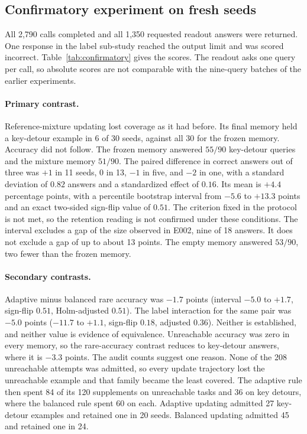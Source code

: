 \documentclass[11pt]{article}
\begin{document}
\subsection{Confirmatory experiment on fresh seeds}
\label{sec:confirmatory}

All 2,790 calls completed and all 1,350 requested readout answers were
returned. One response in the label sub-study reached the output limit
and was scored incorrect. Table~\ref{tab:confirmatory} gives the scores.
The readout asks one query per call, so absolute scores are not
comparable with the nine-query batches of the earlier experiments.



\paragraph{Primary contrast.} Reference-mixture updating lost coverage
as it had before. Its final memory held a key-detour example in 6 of
30 seeds, against all 30 for the frozen memory. Accuracy did not
follow. The frozen memory answered $55/90$ key-detour queries and the
mixture memory $51/90$. The paired difference in correct answers out
of three was $+1$ in 11 seeds, $0$ in 13, $-1$ in five, and $-2$ in
one, with a standard deviation of $0.82$ answers and a standardized
effect of $0.16$. Its mean is $+4.4$ percentage points, with a
percentile bootstrap
interval from $-5.6$ to $+13.3$ points and an exact two-sided
sign-flip value of $0.51$. The criterion fixed in the protocol is not
met, so the retention reading is not confirmed under these conditions.
The interval excludes a gap of the size observed in E002, nine of 18
answers. It does not exclude a gap of up to about 13 points. The empty
memory answered $53/90$, two fewer than the frozen memory.

\paragraph{Secondary contrasts.} Adaptive minus balanced rare accuracy
was $-1.7$ points (interval $-5.0$ to $+1.7$, sign-flip $0.51$,
Holm-adjusted $0.51$). The label interaction for the same pair was
$-5.0$ points ($-11.7$ to $+1.1$, sign-flip $0.18$, adjusted $0.36$).
Neither is established, and neither value is evidence of equivalence.
Unreachable accuracy was zero in every memory, so the rare-accuracy
contrast reduces to key-detour answers, where it is $-3.3$ points. The
audit counts suggest one reason. None of the
208 unreachable attempts was admitted, so every update trajectory lost
the unreachable example and that family became the least covered. The
adaptive rule then spent 84 of its 120 supplements on unreachable tasks
and 36 on key detours, where the balanced rule spent 60 on each.
Adaptive updating admitted 27 key-detour examples and retained one in
20 seeds. Balanced updating admitted 45 and retained one in 24.
\end{document}
